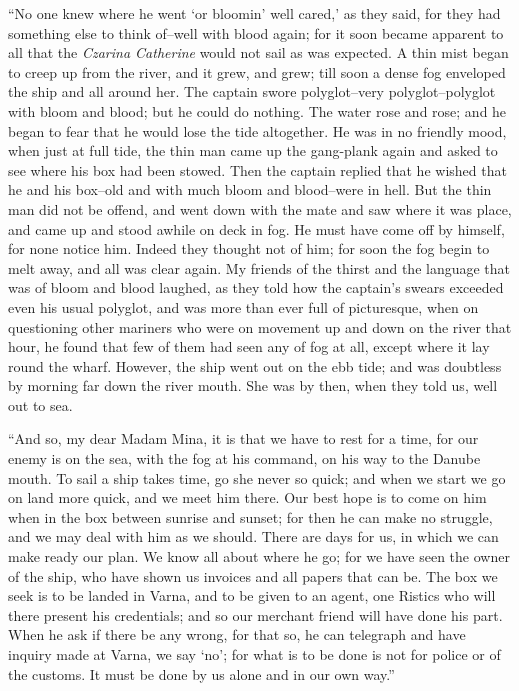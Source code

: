 \documentclass[12pt,openright]{book}
\begin{document}
“No one knew where he went ‘or bloomin’ well cared,’ as they said, for they had something else to think of–well with blood again; for it soon became apparent to all that the \textit{Czarina Catherine} would not sail as was expected. A thin mist began to creep up from the river, and it grew, and grew; till soon a dense fog enveloped the ship and all around her. The captain swore polyglot–very polyglot–polyglot with bloom and blood; but he could do nothing. The water rose and rose; and he began to fear that he would lose the tide altogether. He was in no friendly mood, when just at full tide, the thin man came up the gang-plank again and asked to see where his box had been stowed. Then the captain replied that he wished that he and his box–old and with much bloom and blood–were in hell. But the thin man did not be offend, and went down with the mate and saw where it was place, and came up and stood awhile on deck in fog. He must have come off by himself, for none notice him. Indeed they thought not of him; for soon the fog begin to melt away, and all was clear again. My friends of the thirst and the language that was of bloom and blood laughed, as they told how the captain’s swears exceeded even his usual polyglot, and was more than ever full of picturesque, when on questioning other mariners who were on movement up and down on the river that hour, he found that few of them had seen any of fog at all, except where it lay round the wharf. However, the ship went out on the ebb tide; and was doubtless by morning far down the river mouth. She was by then, when they told us, well out to sea.

“And so, my dear Madam Mina, it is that we have to rest for a time, for our enemy is on the sea, with the fog at his command, on his way to the Danube mouth. To sail a ship takes time, go she never so quick; and when we start we go on land more quick, and we meet him there. Our best hope is to come on him when in the box between sunrise and sunset; for then he can make no struggle, and we may deal with him as we should. There are days for us, in which we can make ready our plan. We know all about where he go; for we have seen the owner of the ship, who have shown us invoices and all papers that can be. The box we seek is to be landed in Varna, and to be given to an agent, one Ristics who will there present his credentials; and so our merchant friend will have done his part. When he ask if there be any wrong, for that so, he can telegraph and have inquiry made at Varna, we say ‘no’; for what is to be done is not for police or of the customs. It must be done by us alone and in our own way.”
\end{document}

